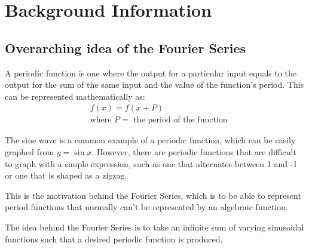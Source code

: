 \documentclass[letterpaper, 12pt]{article}
\begin{document}


\section{Background Information}

\subsection{Overarching idea of the Fourier Series} \label{sec:overarchingIdea}

A periodic function is one where the output for a particular input equals to
the output for the sum of the same input and the value of the function's period.
This can be represented mathematically as:
\begin{align*}
     & f(x) = f(x + P)
    \\
     & \text{where } P = \text{ the period of the function}
\end{align*}

The sine wave is a common example of a periodic function,
which can be easily graphed from \(y = \sin x\).
However, there are periodic functions that are difficult to
graph with a simple expression, such as one that alternates between
1 and -1 or one that is shaped as a zigzag.

This is the motivation behind the Fourier Series, which is to be able to represent
period functions that normally can't be represented by an algebraic function.

The idea behind the Fourier Series is to take an infinite sum of varying sinusoidal
functions such that a desired periodic function is produced.
\end{document}
